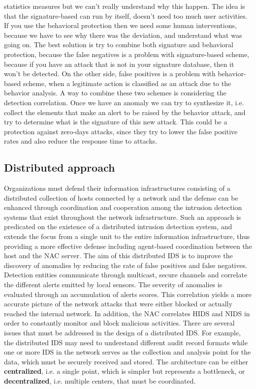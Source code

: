 \documentclass[11pt]{article}
\begin{document}
statistics measures but we can't really understand why this happen. The idea is that the signature-based can run by itself, doesn't need too much user activities. If you use the behavioral protection then we need some human interventions, because we have to see why there was the deviation, and understand what was going on. The best solution is try to combine both signature and behavioral protection, because the false negatives is a problem with signature-based scheme, because if you have an attack that is not in your signature database, then it won't be detected. On the other side, false positives is a problem with behavior-based scheme, when a legitimate action is classified as an attack due to the behavior analysis. A way to combine these two schemes is considering the detection correlation. Once we have an anomaly we can try to synthesize it, i.e. collect the elements that make an alert to be raised by the behavior attack, and try to determine what is the signature of this new attack. This could be a protection against zero-days attacks, since they try to lower the false positive rates and also reduce the response time to attacks.
\subsection{Distributed approach}
Organizations must defend their information infrastructures consisting of a distributed collection of hosts connected by a network and the defense can be enhanced through coordination and cooperation among the intrusion detection systems that exist throughout the network infrastructure. Such an approach is predicated on the existence of a distributed intrusion detection system, and extends the focus from a single unit to the entire information infrastructure, thus providing a more effective defense including agent-based coordination between the host and the NAC server. The aim of this distributed IDS is to improve the discovery of anomalies by reducing the rate of false positives and false negatives. Detection entities communicate through multicast, secure channels and correlate the different alerts emitted by local sensors. The severity of anomalies is evaluated through an accumulation of alerts scores. This correlation yields a more accurate picture of the network attacks that were either blocked or actually reached the internal network. In addition, the NAC correlates HIDS and NIDS in order to constantly monitor and block malicious activities. There are several issues that must be addressed in the design of a distributed IDS. For example, the distributed IDS may need to understand different audit record formats while one or more IDS in the network serves as the collection and analysis point for the data, which must be securely received and stored. The architecture can be either \textbf{centralized}, i.e. a single point, which is simpler but represents a bottleneck, or \textbf{decentralized}, i.e. multiple centers, that must be coordinated.
\end{document}
